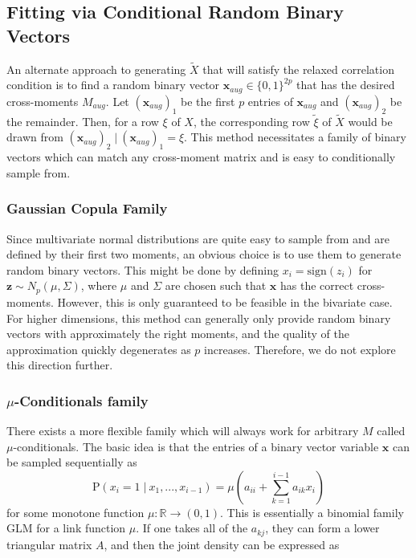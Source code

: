 \documentclass[11pt]{article}
\newcommand{\R}{\mathbb{R}}
\newcommand{\p}{\mathrm{P}}
\newcommand{\st}{ \; \big | \:}
\theoremstyle{definition}
\begin{document}
\subsection{Fitting via Conditional Random Binary Vectors }
An alternate approach to generating $\tilde X$ that will satisfy the relaxed correlation condition is to find a random binary vector $\mathbf{x}_{aug}\in\{0,1\}^{2p}$ that has the desired cross-moments $M_{aug}$. Let $(\mathbf{x}_{aug})_1$ be the first $p$ entries of $\mathbf{x}_{aug}$ and $(\mathbf{x}_{aug})_2$ be the remainder. Then, for a row $\xi$ of $X$, the corresponding row $\tilde \xi$ of $\tilde X$ would be drawn from $(\mathbf{x}_{aug})_2\st (\mathbf{x}_{aug})_1=\xi$. This method necessitates a family of binary vectors which can match any cross-moment matrix and is easy to conditionally sample from.


\subsubsection{Gaussian Copula Family}
Since multivariate normal distributions are quite easy to sample from and are defined by their first two moments, an obvious choice is to use them to generate random binary vectors. This might be done by defining $x_i = \mathrm{sign}(z_i)$ for $\mathbf z\sim N_p(\mu,\Sigma)$, where $\mu$ and $\Sigma$ are chosen such that $\mathbf x$ has the correct cross-moments. However, this is only guaranteed to be feasible in the bivariate case. For higher dimensions, this method can generally only provide random binary vectors with approximately the right moments, and the quality of the approximation quickly degenerates as $p$ increases.\cite{2011arXiv1111.0576S} Therefore, we do not explore this direction further.

\subsubsection{$\mu$-Conditionals family}
There exists a more flexible family which will always work for arbitrary $M$ called $\mu$-conditionals.\cite{2011arXiv1111.0576S} The basic idea is that the entries of a binary vector variable $\mathbf x$ can be sampled sequentially as 
    \[ \p(x_{i}=1\st x_{1},...,x_{i-1}) = \mu\left(a_{ii}+\sum_{k=1}^{i-1}a_{ik}x_i\right) \]
    for some monotone function $\mu:\R\to(0,1)$. This is essentially a binomial family GLM for a link function $\mu$. If one takes all of the $a_{kj}$, they can form a lower triangular matrix $A$, and then the joint density can be expressed as 
\end{document}

